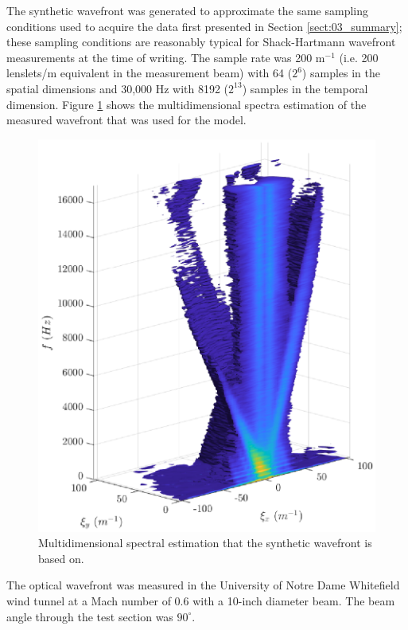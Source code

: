 The synthetic wavefront was generated to approximate the same sampling conditions used to acquire the data first presented in Section \ref{sect:03_summary}; these sampling conditions are reasonably typical for Shack-Hartmann wavefront measurements at the time of writing.
The sample rate was 200 m$^{-1}$ (i.e. 200 lenslets/m equivalent in the measurement beam) with 64 ($2^6$) samples in the spatial dimensions and 30,000 Hz with 8192 ($2^{13}$) samples in the temporal dimension.
Figure \ref{fig:05_dispersion_comp_real} shows the multidimensional spectra estimation of the measured wavefront that was used for the model.
\begin{figure}
  \centering
  \includegraphics{../matlab/05_synthetic_wavefront/dispersion_comp_real.eps}
  \caption{Multidimensional spectral estimation that the synthetic wavefront is based on.}
  \label{fig:05_dispersion_comp_real}
\end{figure}
The optical wavefront was measured in the University of Notre Dame Whitefield wind tunnel at a Mach number of 0.6 with a 10-inch diameter beam.
The beam angle through the test section was $90^\circ$.

